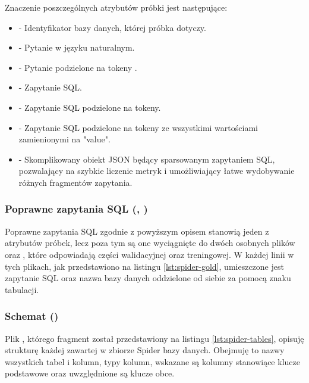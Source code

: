 \begin{minipage}{\linewidth}

\end{minipage}

Znaczenie poszczególnych atrybutów próbki jest następujące:
\begin{itemize}
    \item {} - Identyfikator bazy danych, której próbka dotyczy.
    \item {} - Pytanie w języku naturalnym.
    \item {} - Pytanie podzielone na tokeny .
    \item {} - Zapytanie SQL.
    \item {} - Zapytanie SQL podzielone na tokeny.
    \item {} - Zapytanie SQL podzielone na tokeny ze wszystkimi wartościami zamienionymi na "value".
    \item {} - Skomplikowany obiekt JSON będący sparsowanym zapytaniem SQL, pozwalający na szybkie liczenie metryk i umożliwiający łatwe wydobywanie różnych fragmentów zapytania.
\end{itemize}

\subsubsection{Poprawne zapytania SQL (, )}
Poprawne zapytania SQL zgodnie z powyższym opisem stanowią jeden z atrybutów próbek, lecz poza tym są one wyciągnięte do dwóch osobnych plików  oraz , które odpowiadają części walidacyjnej oraz treningowej. W każdej linii w tych plikach, jak przedstawiono na listingu \ref{lst:spider-gold}, umieszczone jest zapytanie SQL oraz nazwa bazy danych oddzielone od siebie za pomocą znaku tabulacji.

\begin{minipage}{\linewidth}

\end{minipage}

\subsubsection{Schemat ()}
Plik , którego fragment został przedstawiony na listingu \ref{lst:spider-tables}, opisuję strukturę każdej zawartej w zbiorze Spider bazy danych. Obejmuję to nazwy wszystkich tabel i kolumn, typy kolumn, wskazane są kolumny stanowiące klucze podstawowe oraz uwzględnione są klucze obce.

